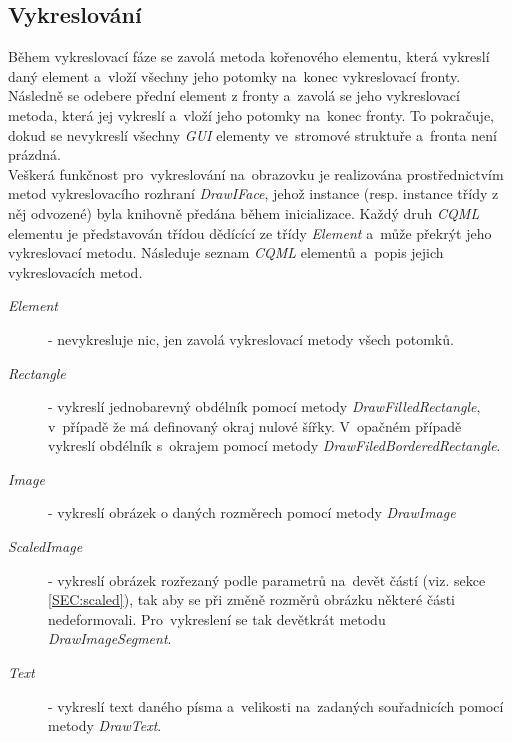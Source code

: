 \documentclass[11pt,twoside,a4paper]{book}
\begin{document}
\subsection{Vykreslování}
Během vykreslovací fáze se zavolá metoda kořenového elementu, která vykreslí daný element a~vloží všechny jeho potomky na~konec vykreslovací fronty. Následně se odebere přední element z fronty a~zavolá se jeho vykreslovací metoda, která jej vykreslí a~vloží jeho potomky na~konec fronty. To pokračuje, dokud se nevykreslí všechny \textit{GUI} elementy ve~stromové struktuře a~fronta není prázdná.\\
Veškerá funkčnost pro~vykreslování na~obrazovku je realizována prostřednictvím metod vykreslovacího rozhraní \textit{DrawIFace}, jehož instance (resp. instance třídy z něj odvozené) byla knihovně předána během inicializace. Každý druh \textit{CQML} elementu je představován třídou dědícící ze třídy \textit{Element} a~může překrýt jeho vykreslovací metodu. Následuje seznam \textit{CQML} elementů a~popis jejich vykreslovacích metod.
\begin{description}
\item [\textit{Element}] - nevykresluje nic, jen zavolá vykreslovací metody všech potomků.
\item [\textit{Rectangle}] - vykreslí jednobarevný obdélník pomocí metody \textit{DrawFilledRectangle}, v~případě že má definovaný okraj nulové šířky. V~opačném případě vykreslí obdélník s~okrajem pomocí metody \textit{DrawFiledBorderedRectangle}.
\item [\textit{Image}] - vykreslí obrázek o daných rozměrech pomocí metody \textit{DrawImage}
\item [\textit{ScaledImage}] - vykreslí obrázek rozřezaný podle parametrů na~devět částí (viz. sekce \ref{SEC:scaled}), tak aby se při změně rozměrů obrázku některé části nedeformovali. Pro~vykreslení se tak devětkrát metodu \textit{DrawImageSegment}.
\item [\textit{Text}] - vykreslí text daného písma a~velikosti na~zadaných souřadnicích pomocí metody \textit{DrawText}.
\end{description}

\end{document}
